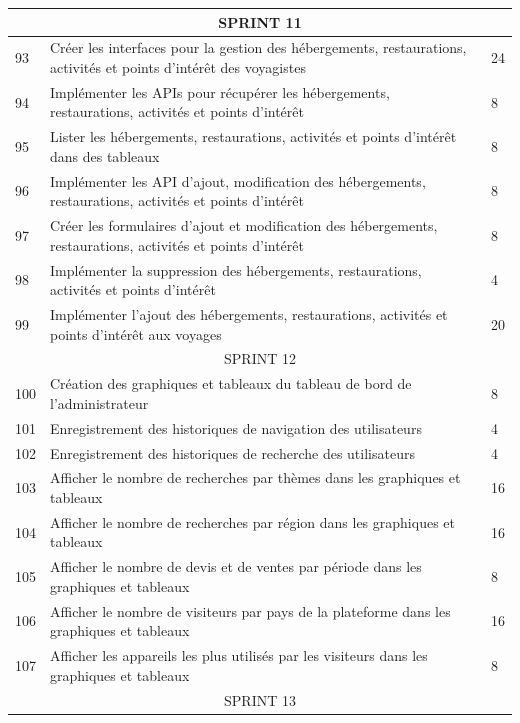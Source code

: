 \documentclass[12pt]{report}
\begin{document}
\begin{longtable}{|p{1cm}|p{7cm}|p{6cm}|}
						\multicolumn{3}{|c|}{SPRINT 11}\\
						\hline
						93 & Créer les interfaces pour la gestion des hébergements, restaurations, activités et points d'intérêt des voyagistes & 24\\
						\hline
						94 & Implémenter les APIs pour récupérer les hébergements, restaurations, activités et points d'intérêt & 8\\
						\hline
						95 & Lister les hébergements, restaurations, activités et points d'intérêt dans des tableaux & 8\\
						\hline
						96 & Implémenter les API d'ajout, modification des hébergements, restaurations, activités et points d'intérêt & 8\\
						\hline
						97 & Créer les formulaires d'ajout et modification des hébergements, restaurations, activités et points d'intérêt & 8\\
						\hline
						98 & Implémenter la suppression des hébergements, restaurations, activités et points d'intérêt & 4\\
						\hline
						99 & Implémenter l'ajout des hébergements, restaurations, activités et points d'intérêt aux voyages & 20\\
						\hline
						\multicolumn{3}{|c|}{SPRINT 12}\\
						\hline
						100 & Création des graphiques et tableaux du tableau de bord de l'administrateur & 8\\
						\hline
						101 & Enregistrement des historiques de navigation des utilisateurs & 4\\
						\hline
						102 & Enregistrement des historiques de recherche des utilisateurs & 4\\
						\hline
						103 & Afficher le nombre de recherches par thèmes dans les graphiques et tableaux & 16\\
						\hline
						104 & Afficher le nombre de recherches par région dans les graphiques et tableaux & 16\\
						\hline
						105 & Afficher le nombre de devis et de ventes par période dans les graphiques et tableaux & 8\\
						\hline
						106 & Afficher le nombre de visiteurs par pays de la plateforme dans les graphiques et tableaux & 16\\
						\hline
						107 & Afficher les appareils les plus utilisés par les visiteurs dans les graphiques et tableaux & 8\\
						\hline
						\multicolumn{3}{|c|}{SPRINT 13}\\

\end{longtable}
\end{document}
